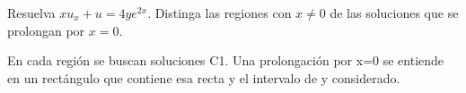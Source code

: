 Resuelva $xu_x+u=4ye^{2x}$. Distinga las regiones con $x\ne0$ de las soluciones que se prolongan por $x=0$.

En cada región se buscan soluciones C1. Una prolongación por x=0 se entiende en un rectángulo que contiene esa recta y el intervalo de y considerado.
